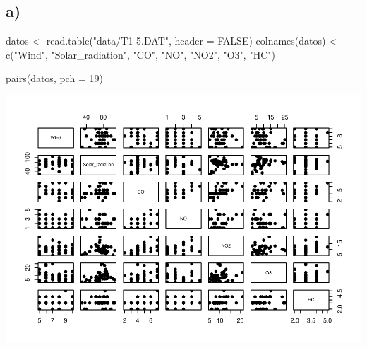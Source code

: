 \documentclass[
]{article}
\newenvironment{Shaded}{\begin{snugshade}}{\end{snugshade}}
\newcommand{\AttributeTok}[1]{\textcolor[rgb]{0.77,0.63,0.00}{#1}}
\newcommand{\ConstantTok}[1]{\textcolor[rgb]{0.00,0.00,0.00}{#1}}
\newcommand{\DecValTok}[1]{\textcolor[rgb]{0.00,0.00,0.81}{#1}}
\newcommand{\FunctionTok}[1]{\textcolor[rgb]{0.00,0.00,0.00}{#1}}
\newcommand{\NormalTok}[1]{#1}
\newcommand{\OtherTok}[1]{\textcolor[rgb]{0.56,0.35,0.01}{#1}}
\newcommand{\StringTok}[1]{\textcolor[rgb]{0.31,0.60,0.02}{#1}}
\begin{document}
\hypertarget{a-2}{%
\subsection{a)}\label{a-2}}

\begin{Shaded}
\begin{Highlighting}[]
\NormalTok{datos }\OtherTok{\textless{}{-}} \FunctionTok{read.table}\NormalTok{(}\StringTok{"data/T1{-}5.DAT"}\NormalTok{, }\AttributeTok{header =} \ConstantTok{FALSE}\NormalTok{)}
\FunctionTok{colnames}\NormalTok{(datos) }\OtherTok{\textless{}{-}} \FunctionTok{c}\NormalTok{(}\StringTok{"Wind"}\NormalTok{, }\StringTok{"Solar\_radiation"}\NormalTok{, }\StringTok{"CO"}\NormalTok{, }\StringTok{"NO"}\NormalTok{, }\StringTok{"NO2"}\NormalTok{, }\StringTok{"O3"}\NormalTok{, }\StringTok{"HC"}\NormalTok{)}

\FunctionTok{pairs}\NormalTok{(datos, }\AttributeTok{pch =} \DecValTok{19}\NormalTok{)}
\end{Highlighting}
\end{Shaded}

\includegraphics{Tarea1_files/figure-latex/unnamed-chunk-9-1.pdf}
\end{document}
